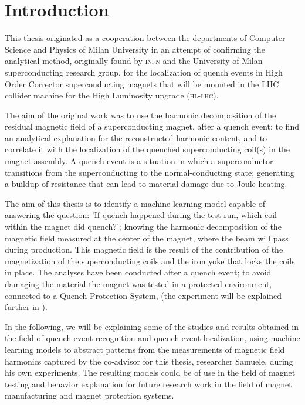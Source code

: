 \chapter{Introduction}
This thesis originated as a cooperation between the departments of Computer Science and Physics of
Milan University in an attempt of confirming the analytical method, originally found by
\textsc{infn} and the University of Milan superconducting research group, for the localization of
quench events in High Order Corrector superconducting magnets \cite{mariotto2022,
	mariotto2022-generic} that will be mounted in the LHC collider machine for the High
Luminosity upgrade \cite{rossi2024} (\textsc{hl-lhc}).

The aim of the original work was to use the harmonic decomposition of the residual magnetic field of
a superconducting magnet, after a quench event; to find an analytical explanation for the
reconstructed harmonic content, and to correlate it with the localization of the quenched
superconducting coil(s) in the magnet assembly. A quench event is a situation in which a
superconductor transitions from the superconducting to the normal-conducting state; generating a
buildup of resistance that can lead to material damage due to Joule heating.

The aim of this thesis is to identify a machine learning model capable of answering the question: 'If quench
happened during the test run, which coil within the magnet did quench?'; knowing the harmonic
decomposition of the magnetic field measured at the center of the magnet, where the beam will pass
during production. This magnetic field is the result of the contribution of the magnetization of the
superconducting coils and the iron yoke that locks the coils in place. The analyses have been
conducted after a quench event; to avoid damaging the material the magnet was tested in a protected environment, connected to a Quench Protection System, (the experiment will be explained further in ).

In the following, we will be explaining some of the studies and results obtained in the field of
quench event recognition and quench event localization, using machine learning models to abstract
patterns from the measurements of magnetic field harmonics captured by the co-advisor for this
thesis, researcher Samuele, during his own experiments. The resulting models could be of use in the
field of magnet testing and behavior explanation for future research work in the field of magnet
manufacturing and magnet protection systems.

